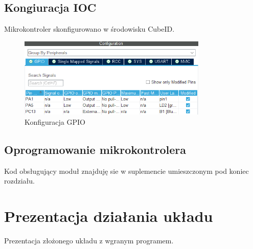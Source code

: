 \documentclass[11pt, a4paper]{article}
\begin{document}
\newpage

\subsection{Kongiuracja IOC}
Mikrokontroler skonfigurowano w środowisku CubeID.

\vspace{0.5cm}
\begin{figure}[h!]
    \centering
    \includegraphics[width=9cm]{fig/KY-031/polaczenie_modulu/confIOC.png}
    \caption{Konfiguracja GPIO}
    \label{fig:my_label}
\end{figure}
\vspace{0.5cm}

\subsection{Oprogramowanie mikrokontrolera}
Kod obsługujący moduł znajduję sie w suplemencie umieszczonym pod koniec rozdziału.

\section{Prezentacja działania układu}
Prezentacja złożonego układu z wgranym programem.
\end{document}
